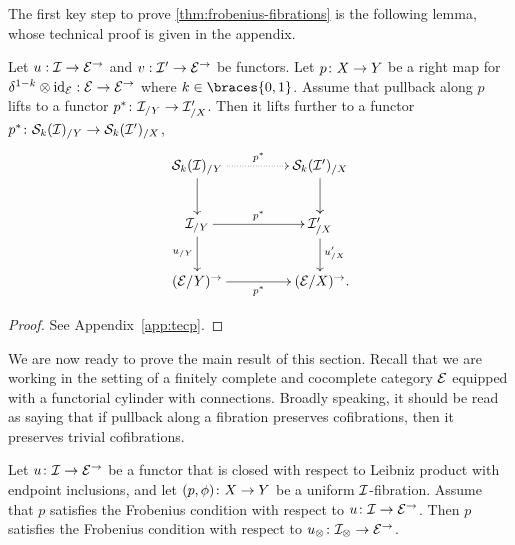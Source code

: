 \documentclass[reqno,10pt,a4paper,oneside]{amsart}
\begin{document}
\medskip

The first key step to prove \cref{thm:frobenius-fibrations} is the following lemma, whose technical proof is given in the appendix.


\begin{lemma} \label{strong-h-equiv-base-change-along-fibration}
Let $u : \cal{I} \to \catE^\to$ and $v : \cal{I}' \to \catE^\to$ be functors.
Let $p \co X \to Y$ be a right map for $\kcylinv \otimes \id_{\calE} : \catE \to \catE^\to$ where $k \in \braces{0, 1}$.
Assume that pullback along $p$ lifts to a functor $p^* \co \cal{I}_{/Y} \to \cal{I}_{/X}'$.
Then it lifts further to a functor $p^* \co \cal{S}_k(\cal{I})_{/Y} \to \cal{S}_k(\cal{I}')_{/X}$,
\[
\xymatrix@C+2em{
  \cal{S}_k(\cal{I})_{/Y}
  \ar@{.>}[r]^{p^*}
  \ar[d]
&
  \cal{S}_k(\cal{I}')_{/X}
  \ar[d]
\\
  \cal{I}_{/Y}
  \ar[r]^{p^*}
  \ar[d]_{u_{/Y}}
&
  \cal{I}_{/X}'
  \ar[d]^{u_{/X}'}
\\
  (\catE / Y)^\to
  \ar[r]_{p^*}
&
  (\catE / X)^\to \rlap{.}
}
\]
\end{lemma}

\begin{proof} See Appendix~\ref{app:tecp}.
\end{proof}

We are now ready to prove the main result of this section.
Recall that we are working in the setting of a finitely complete and cocomplete category $\cal{E}$ equipped with a functorial cylinder with connections.
Broadly speaking, it should be read as saying that if pullback along a fibration preserves cofibrations, then it preserves trivial cofibrations.

\begin{theorem} \label{thm:frobenius-fibrations}
Let $u \co \cal{I} \to \catE^\to$ be a functor that is closed with respect to Leibniz product with endpoint inclusions, and let $(p,\phi) \co X \to Y$ be a uniform $\cal{I}$-fibration.
Assume that $p$ satisfies the Frobenius condition with respect to $u \co \cal{I} \to \cal{E}^\to$.
Then $p$ satisfies the Frobenius condition with respect to $u_\otimes \co \cal{I}_\otimes \to \catE^\to$.
\end{theorem}
\end{document}
